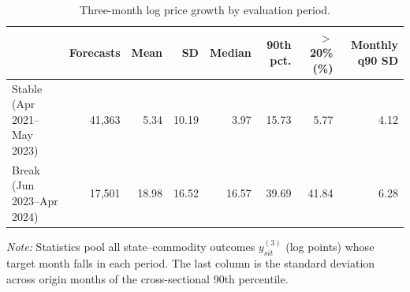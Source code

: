 \begin{table}[t]
\caption{Three-month log price growth by evaluation period.\label{tab:desc}}
\centering\footnotesize\setlength{\tabcolsep}{3pt}
\begin{tabular*}{\textwidth}{@{\extracolsep\fill}lrrrrrrr@{}}
\toprule
 & \textbf{Forecasts} & \textbf{Mean} & \textbf{SD} & \textbf{Median} & \textbf{90th pct.} & \textbf{$>$20\% (\%)} & \textbf{Monthly q90 SD} \\
\midrule
Stable (Apr 2021--May 2023) & 41,363 & 5.34 & 10.19 & 3.97 & 15.73 & 5.77 & 4.12 \\
Break (Jun 2023--Apr 2024) & 17,501 & 18.98 & 16.52 & 16.57 & 39.69 & 41.84 & 6.28 \\
\bottomrule
\end{tabular*}
\begin{tablenotes}
\item \textit{Note:} Statistics pool all state--commodity outcomes $y^{(3)}_{sit}$ (log points) whose target month falls in each period. The last column is the standard deviation across origin months of the cross-sectional 90th percentile.
\end{tablenotes}
\end{table}
